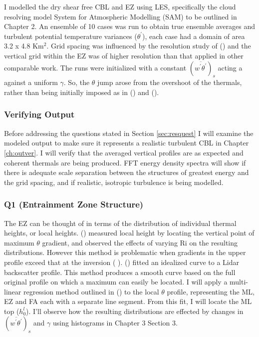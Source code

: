 I modelled the dry shear free \acs{CBL} and \acs{EZ} using \acs{LES}, specifically the cloud resolving model System for Atmospheric Modelling (SAM) to be outlined in Chapter 2.  An ensemble of 10 cases was run to obtain true ensemble averages and turbulent potential temperature variances ($\theta^{'}$), each case had a domain of area 3.2 x 4.8 Km$^{2}$. Grid spacing was influenced by the resolution study of \citeauthor{SullPat} (\citeyear{SullPat}) and the vertical grid within the \acs{EZ} was of higher resolution than that applied in other comparable work.  The runs were initialized with a constant $(\overline{w^{'}\theta^{'}})_{s}$ acting a against a uniform $\gamma$.  So, the  $\theta$ jump arose from the overshoot of the thermals, rather than being initially imposed as in \citeauthor{SullMoengStev} (\citeyear{SullMoengStev}) and \citeauthor{BrooksFowler2} (\citeyear{BrooksFowler2}).\\

\subsubsection{Verifying Output}

Before addressing the questions stated in Section \ref{sec:resquest} I will examine the modeled output to make sure it represents a realistic turbulent \acs{CBL} in Chapter \ref{ch:outver}. I will verify that the averaged vertical profiles are as expected and coherent thermals are being produced.  FFT energy density spectra will show if there is adequate scale separation between the structures of greatest energy and the grid spacing, and if realistic, isotropic turbulence is being modelled.  

\subsubsection{Q1 (Entrainment Zone Structure)}     
The \acs{EZ} can be thought of in terms of the distribution of individual thermal heights, or local heights. \citeauthor{SullMoengStev} (\citeyear{SullMoengStev}) measured local height by locating the vertical point of maximum $\theta$ gradient, and observed the effects of varying \acs{Ri} on the resulting distributions. However this method is problematic when gradients in the upper profile exceed that at the inversion (\citeauthor{BrooksFowler2} \citeyear{BrooksFowler2}).  \citeauthor{SteynBaldHoff} (\citeyear{SteynBaldHoff}) fitted an idealized curve to a Lidar backscatter profile.  This method produces a smooth curve based on the full original profile on which a maximum can easily be located.  I will apply a multi-linear regression method outlined in \citeauthor{Vieth} (\citeyear{Vieth}) to the local $\theta$ profile, representing the \acs{ML}, \acs{EZ} and \acs{FA} each with a separate line segment. From this fit, I will locate the \acs{ML} top ($h^{l}_{0}$).  I'll observe how the resulting distributions are effected by changes in $(\overline{w^{'}\theta^{'}})_{s}$ and $\gamma$ using histograms in Chapter 3 Section 3.\\

